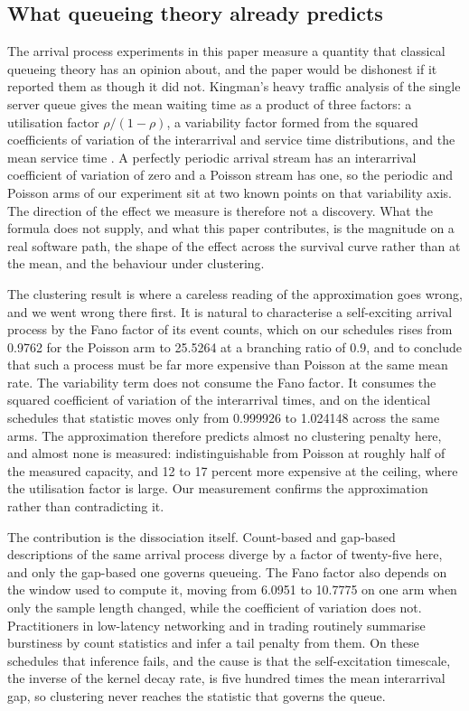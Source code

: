 \documentclass[conference]{IEEEtran}
\begin{document}
\subsection{What queueing theory already predicts}
\label{sec:queueing}

The arrival process experiments in this paper measure a quantity that
classical queueing theory has an opinion about, and the paper would be
dishonest if it reported them as though it did not. Kingman's heavy traffic
analysis of the single server queue gives the mean waiting time as a product
of three factors: a utilisation factor $\rho/(1-\rho)$, a variability factor
formed from the squared coefficients of variation of the interarrival and
service time distributions, and the mean service time
\cite{kingman1961heavy,kingman1962queues}. A perfectly periodic arrival stream
has an interarrival coefficient of variation of zero and a Poisson stream has
one, so the periodic and Poisson arms of our experiment sit at two known
points on that variability axis. The direction of the effect we measure is
therefore not a discovery. What the formula does not supply, and what this
paper contributes, is the magnitude on a real software path, the shape of the
effect across the survival curve rather than at the mean, and the behaviour
under clustering.

The clustering result is where a careless reading of the approximation goes
wrong, and we went wrong there first. It is natural to characterise a
self-exciting arrival process \cite{hawkes1971spectra} by the Fano factor of
its event counts, which on our schedules rises from 0.9762 for the Poisson arm
to 25.5264 at a branching ratio of 0.9, and to conclude that such a process
must be far more expensive than Poisson at the same mean rate. The
variability term does not consume the Fano factor. It consumes the squared
coefficient of variation of the interarrival times, and on the identical
schedules that statistic moves only from 0.999926 to 1.024148 across the same arms.
The approximation therefore predicts almost no clustering penalty here, and
almost none is measured: indistinguishable from Poisson at roughly half of
the measured capacity, and 12 to 17 percent more expensive at the ceiling,
where the utilisation factor is large. Our measurement confirms the
approximation rather than contradicting it.

The contribution is the dissociation itself. Count-based and gap-based
descriptions of the same arrival process diverge by a factor of twenty-five
here, and only the gap-based one governs queueing. The Fano factor also
depends on the window used to compute it, moving from 6.0951 to 10.7775 on one arm
when only the sample length changed, while the coefficient of variation does
not. Practitioners in low-latency networking and in trading routinely
summarise burstiness by count statistics and infer a tail penalty from them.
On these schedules that inference fails, and the cause is that the
self-excitation timescale, the inverse of the kernel decay rate, is five
hundred times the mean interarrival gap, so clustering never reaches the
statistic that governs the queue.
\end{document}
